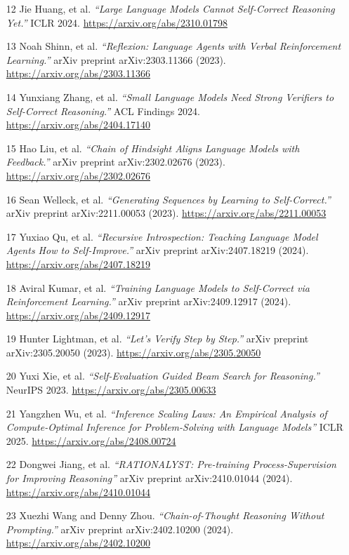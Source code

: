 \documentclass[12pt]{article}
\begin{document}
\begin{itemize}
    \item [12] Jie Huang, et al. \textit{``Large Language Models Cannot Self-Correct Reasoning Yet.''} ICLR 2024. \url{https://arxiv.org/abs/2310.01798}
    \item [13] Noah Shinn, et al. \textit{``Reflexion: Language Agents with Verbal Reinforcement Learning.''} arXiv preprint arXiv:2303.11366 (2023). \url{https://arxiv.org/abs/2303.11366}
    \item [14] Yunxiang Zhang, et al. \textit{``Small Language Models Need Strong Verifiers to Self-Correct Reasoning.''} ACL Findings 2024. \url{https://arxiv.org/abs/2404.17140}
    \item [15] Hao Liu, et al. \textit{``Chain of Hindsight Aligns Language Models with Feedback.''} arXiv preprint arXiv:2302.02676 (2023). \url{https://arxiv.org/abs/2302.02676}
    \item [16] Sean Welleck, et al. \textit{``Generating Sequences by Learning to Self-Correct.''} arXiv preprint arXiv:2211.00053 (2023). \url{https://arxiv.org/abs/2211.00053}
    \item [17] Yuxiao Qu, et al. \textit{``Recursive Introspection: Teaching Language Model Agents How to Self-Improve.''} arXiv preprint arXiv:2407.18219 (2024). \url{https://arxiv.org/abs/2407.18219}
    \item [18] Aviral Kumar, et al. \textit{``Training Language Models to Self-Correct via Reinforcement Learning.''} arXiv preprint arXiv:2409.12917 (2024). \url{https://arxiv.org/abs/2409.12917}
    \item [19] Hunter Lightman, et al. \textit{``Let’s Verify Step by Step.''} arXiv preprint arXiv:2305.20050 (2023). \url{https://arxiv.org/abs/2305.20050}
    \item [20] Yuxi Xie, et al. \textit{``Self-Evaluation Guided Beam Search for Reasoning.''} NeurIPS 2023. \url{https://arxiv.org/abs/2305.00633}
    \item [21] Yangzhen Wu, et al. \textit{``Inference Scaling Laws: An Empirical Analysis of Compute-Optimal Inference for Problem-Solving with Language Models''} ICLR 2025. \url{https://arxiv.org/abs/2408.00724}
    \item [22] Dongwei Jiang, et al. \textit{``RATIONALYST: Pre-training Process-Supervision for Improving Reasoning''} arXiv preprint arXiv:2410.01044 (2024). \url{https://arxiv.org/abs/2410.01044}
    \item [23] Xuezhi Wang and Denny Zhou. \textit{``Chain-of-Thought Reasoning Without Prompting.''} arXiv preprint arXiv:2402.10200 (2024). \url{https://arxiv.org/abs/2402.10200}

\end{itemize}
\end{document}
